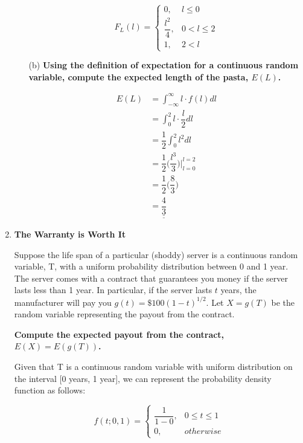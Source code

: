 \documentclass[12pt,a4paper]{article}
\numberwithin{equation}{subsection}
\def\doubleunderline#1{\underline{\underline{#1}}}
\begin{document}
\begin{enumerate}
\begin{enumerate}
\begin{equation*}
F_{L}(l) = \begin{cases} 0, &l \leq 0 \\
\dfrac{l^{2}}{4}, &0 < l \leq 2 \\ 
1, &2 < l
\end{cases}
\end{equation*}

\item[(b)]\textbf{Using the definition of expectation for a continuous random variable, compute the expected length of the pasta, $E(L)$.}

\begin{equation*}
\begin{split}
E(L) &= \int_{-\infty}^{\infty}l \cdot f(l)dl \\
& = \int_0^2 l \cdot \dfrac{l}{2}dl \\
& = \dfrac{1}{2}\int_0^2 l^2 dl \\
& = \dfrac{1}{2}\bigg(\dfrac{l^3}{3}\bigg)\bigg\rvert_{l = 0}^{l = 2} \\
& = \dfrac{1}{2}\bigg(\dfrac{8}{3}\bigg) \\
& = \doubleunderline{\dfrac{4}{3}}
\end{split}
\end{equation*}

\end{enumerate}


\item \textbf{The Warranty is Worth It}

Suppose the life span of a particular (shoddy) server is a continuous random variable, T, with a uniform probability distribution between 0 and 1 year.  The server comes with a contract that guarantees you money if the server lasts less than 1 year.  In particular, if the server lasts $t$ years, the manufacturer will pay you $g(t)= \$100(1-t)^{1/2}$.  Let $X = g(T)$ be the random variable representing the payout from the contract.

\textbf{Compute the expected payout from the contract, $E(X) = E(g(T))$.}

Given that T is a continuous random variable with uniform distribution on the interval [0 years, 1 year], we can represent the probability density function as follows:

$$f(t;0,1) = \begin{cases} \dfrac{1}{1 - 0}, &0 \leq t \leq 1 \\
0, &otherwise
\end{cases}
$$


\end{enumerate}
\end{document}
